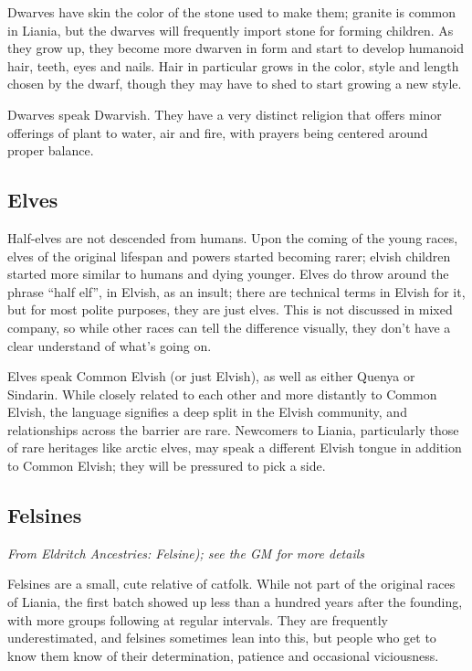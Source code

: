 \documentclass{report}
\begin{document}
Dwarves have skin the color of the stone used to make them; granite is common
in Liania, but the dwarves will frequently import stone for forming children.
As they grow up, they become more dwarven in form and start to develop humanoid
hair, teeth, eyes and nails. Hair in particular grows in the color, style and
length chosen by the dwarf, though they may have to shed to start growing a new
style.

Dwarves speak Dwarvish. They have a very distinct religion that offers minor
offerings of plant to water, air and fire, with prayers being centered around
proper balance.

\subsection{Elves}

Half-elves are not descended from humans. Upon the coming of the young races,
elves of the original lifespan and powers started becoming rarer; elvish
children started more similar to humans and dying younger. Elves do throw around
the phrase ``half elf'', in Elvish, as an insult; there are technical terms in Elvish for it,
but for most polite purposes, they are just elves. This is not
discussed in mixed company, so while other races can tell the difference
visually, they don't have a clear understand of what's going on.

Elves speak Common Elvish (or just Elvish), as well as either Quenya or Sindarin.
While closely related to each other and more distantly to Common Elvish, the
language signifies a deep split in the Elvish community, and relationships
across the barrier are rare. Newcomers to Liania, particularly those of rare
heritages like arctic elves, may speak a different Elvish
tongue in addition to Common Elvish; they will be pressured to pick a side.

\subsection{Felsines}

\emph{From \emph{Eldritch Ancestries: Felsine}); see the GM for more details}

Felsines are a small, cute relative of catfolk. While not part of the original
races of Liania, the first batch showed up less than a hundred years after the
founding, with more groups following at regular intervals. They are frequently
underestimated, and felsines sometimes lean into this, but people who get to
know them know of their determination, patience and occasional viciousness.
\end{document}
